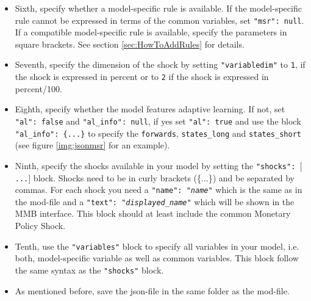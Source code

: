 \begin{itemize}
\item Sixth, specify whether a model-specific rule is available. If the model-specific rule cannot be expressed in terms of the common variables, set \texttt{"msr": null}. If a compatible model-specific rule is available, specify the parameters in square brackets. See section \ref{sec:HowToAddRules} for details.
\item Seventh, specify the dimension of the shock by setting \texttt{"variabledim"} to \texttt{1}, if the shock is expressed in percent or to \texttt{2} if the shock is expressed in percent/100.
\item Eighth, specify whether the model features adaptive learning. If not, set \texttt{"al": false} and \texttt{"al\_info": null}, if yes set \texttt{"al": true} and use the block \texttt{"al\_info": \{...\}} to specify the \texttt{forwards}, \texttt{states\_long} and \texttt{states\_short} (see figure \ref{img:jsonmsr} for an example).
\item Ninth, specify the shocks available in your model by setting the \texttt{"shocks": $[$...$]$} block. Shocks need to be in curly brackets (\{...\}) and be separated by commas. For each shock you need a \texttt{"name": "\textit{name}"} which is the same as in the mod-file and a \texttt{"text": "\textit{displayed\_name}"} which will be shown in the MMB interface. This block should at least include the common Monetary Policy Shock.
\item Tenth, use the \texttt{"variables"} block to specify all variables in your model, i.e. both, model-specific variable as well as common variables. This block follow the same syntax as the  \texttt{"shocks"} block.
\item As mentioned before, save the json-file in the same folder as the mod-file.

\end{itemize}



